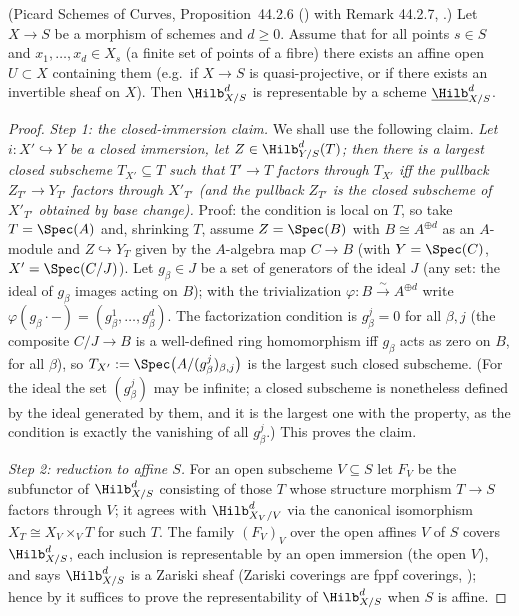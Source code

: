 \begin{lemma}
\label{lem:pc-hilb-representable}
(Picard Schemes of Curves, Proposition~44.2.6 () with Remark 44.2.7,
.)  Let $X\to S$
be a morphism of schemes and $d\geq0$.  Assume that for all points
$s\in S$ and $x_1,\dots,x_d\in X_s$ (a finite set of points of a fibre)
there exists an affine open $U\subset X$ containing them
(e.g.\ if $X\to S$ is quasi-projective, or if there exists an
 invertible sheaf on $X$).  Then
$\Hilb^d_{X/S}$ is representable by a scheme
$\underline{\Hilb}^d_{X/S}$.
\end{lemma}
\begin{proof}
\emph{Step 1: the closed-immersion claim.}  We shall use the following
claim.  \emph{Let $i:X'\hookrightarrow Y$ be a closed immersion, let
$Z\in\Hilb^d_{Y/S}(T)$; then there is a largest closed subscheme
$T_{X'}\subseteq T$ such that $T'\to T$ factors through $T_{X'}$ iff
the pullback $Z_{T'}\to Y_{T'}$ factors through $X'_{T'}$ (and the
pullback $Z_{T'}$ is the closed subscheme of $X'_{T'}$ obtained by
base change).}  Proof: the condition is local on $T$, so take
$T=\Spec(A)$ and, shrinking $T$, assume
$Z=\Spec(B)$ with $B\cong A^{\oplus d}$ as an $A$-module and
$Z\hookrightarrow Y_T$ given by the $A$-algebra map
$C\to B$ (with $Y=\Spec(C)$, $X'=\Spec(C/J)$).  Let $g_\beta\in J$ be
a set of generators of the ideal $J$ (any set: the ideal of $g_\beta$
images acting on $B$); with the trivialization
$\varphi:B\stackrel{\sim}{\to}A^{\oplus d}$ write
$\varphi(g_\beta\cdot-)=(g_\beta^1,\dots,g_\beta^d)$.  The
factorization condition is
$g_\beta^j=0$ for all $\beta,j$ (the composite
$C/J\to B$ is a well-defined ring homomorphism iff $g_\beta$ acts as
zero on $B$, for all $\beta$), so
$T_{X'}:=\Spec\bigl(A/(g_\beta^j)_{\beta,j}\bigr)$ is the largest such
closed subscheme.  (For the ideal the set $(g_\beta^j)$ may be
infinite; a closed subscheme is nonetheless defined by the ideal
generated by them, and it is the largest one with the property, as
the condition is exactly the vanishing of all $g_\beta^j$.)  This
proves the claim.

\emph{Step 2: reduction to affine $S$.}  For an open subscheme
$V\subseteq S$ let $F_V$ be the subfunctor of $\Hilb^d_{X/S}$ consisting
of those $T$ whose structure morphism $T\to S$ factors through $V$; it
agrees with $\Hilb^d_{X_V/V}$ via the canonical isomorphism
$X_T\cong X_V\times_VT$ for such $T$.  The family $(F_V)_V$ over the
open affines $V$ of $S$ covers $\Hilb^d_{X/S}$, each inclusion is
representable by an open immersion (the open $V$), and
 says $\Hilb^d_{X/S}$ is a Zariski sheaf
(Zariski coverings are fppf coverings, );
hence by  it suffices to prove the
representability of $\Hilb^d_{X/S}$ when $S$ is affine.


\end{proof}
